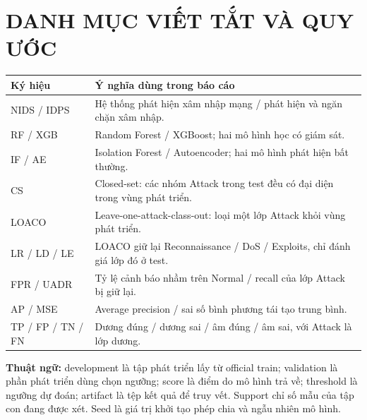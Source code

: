 \documentclass[12pt,a4paper,oneside]{report}
\begin{document}
\par
\clearpage
{}
\setcounter{page}{1}
\begingroup\fontsize{10pt}{12pt}\selectfont{}\tableofcontents\endgroup
\clearpage
{}
\begingroup\fontsize{10pt}{12pt}\selectfont{}
\par\vspace{0.45cm}
\makeatletter{}\makeatother
\endgroup\clearpage
{}
\begingroup\fontsize{10pt}{12pt}\selectfont{}
\par\vspace{0.45cm}
\makeatletter{}\makeatother
\endgroup\clearpage
\chapter*{DANH MỤC VIẾT TẮT VÀ QUY ƯỚC}
\begingroup\small\renewcommand{\arraystretch}{1.2}
\noindent\begin{tabularx}{\textwidth}{L{2.8cm}Y}\toprule
Ký hiệu & Ý nghĩa dùng trong báo cáo\\\midrule
NIDS / IDPS & Hệ thống phát hiện xâm nhập mạng / phát hiện và ngăn chặn xâm nhập.\\
RF / XGB & Random Forest / XGBoost; hai mô hình học có giám sát.\\
IF / AE & Isolation Forest / Autoencoder; hai mô hình phát hiện bất thường.\\
CS & Closed-set: các nhóm Attack trong test đều có đại diện trong vùng phát triển.\\
LOACO & Leave-one-attack-class-out: loại một lớp Attack khỏi vùng phát triển.\\
LR / LD / LE & LOACO giữ lại Reconnaissance / DoS / Exploits, chỉ đánh giá lớp đó ở test.\\
FPR / UADR & Tỷ lệ cảnh báo nhầm trên Normal / recall của lớp Attack bị giữ lại.\\
AP / MSE & Average precision / sai số bình phương tái tạo trung bình.\\
TP / FP / TN / FN & Dương đúng / dương sai / âm đúng / âm sai, với Attack là lớp dương.\\
\bottomrule\end{tabularx}\endgroup

\textbf{Thuật ngữ:} development là tập phát triển lấy từ official train; validation là phần phát triển dùng chọn ngưỡng; score là điểm do mô hình trả về; threshold là ngưỡng dự đoán; artifact là tệp kết quả để truy vết. Support chỉ số mẫu của tập con đang được xét. Seed là giá trị khởi tạo phép chia và ngẫu nhiên mô hình.
\end{document}
